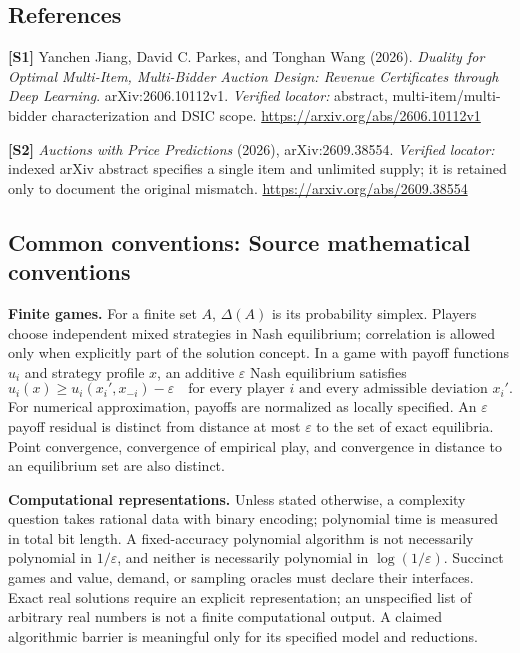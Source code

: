 \documentclass[11pt,a4paper]{article}
\begin{document}
\subsection*{References}
\begingroup\footnotesize\raggedright
\textbf{[S1]} Yanchen Jiang, David C. Parkes, and Tonghan Wang (2026). \emph{Duality for Optimal Multi-Item, Multi-Bidder Auction Design: Revenue Certificates through Deep Learning}. arXiv:2606.10112v1. \textit{Verified locator:} abstract, multi-item/multi-bidder characterization and DSIC scope. \url{https://arxiv.org/abs/2606.10112v1}
\par\textbf{[S2]} \emph{Auctions with Price Predictions} (2026), arXiv:2609.38554. \textit{Verified locator:} indexed arXiv abstract specifies a single item and unlimited supply; it is retained only to document the original mismatch. \url{https://arxiv.org/abs/2609.38554}
\par\endgroup

\subsection*{Common conventions: Source mathematical conventions}

\textbf{Finite games.} For a finite set $A$, $\Delta(A)$ is its probability
simplex. Players choose independent mixed strategies in Nash equilibrium;
correlation is allowed only when explicitly part of the solution concept.
In a game with payoff functions $u_i$ and strategy profile $x$, an additive
$\varepsilon$ Nash equilibrium satisfies
\[
 u_i(x)\geq u_i(x_i',x_{-i})-\varepsilon
 \quad\text{for every player $i$ and every admissible deviation $x_i'$}.
\]
For numerical approximation, payoffs are normalized as locally specified.
An $\varepsilon$ payoff residual is distinct from distance at most
$\varepsilon$ to the set of exact equilibria. Point convergence, convergence
of empirical play, and convergence in distance to an equilibrium set are
also distinct.

\textbf{Computational representations.} Unless stated otherwise, a complexity
question takes rational data with binary encoding; polynomial time is measured
in total bit length. A fixed-accuracy polynomial algorithm is not necessarily
polynomial in $1/\varepsilon$, and neither is necessarily polynomial in
$\log(1/\varepsilon)$. Succinct games and value, demand, or sampling oracles
must declare their interfaces. Exact real solutions require an explicit
representation; an unspecified list of arbitrary real numbers is not a
finite computational output. A claimed algorithmic barrier is meaningful
only for its specified model and reductions.
\end{document}
